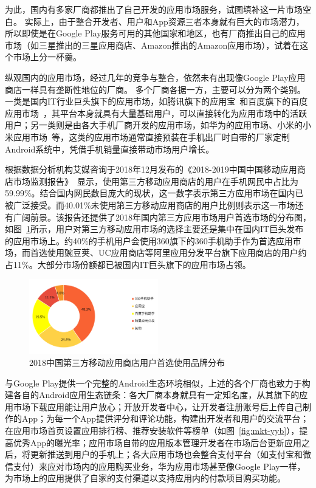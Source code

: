 为此，国内有多家厂商都推出了自己开发的应用市场服务，试图填补这一片市场空白。
实际上，由于整合开发者、用户和App资源三者本身就有巨大的市场潜力，所以即使是在Google Play服务可用的其他国家和地区，也有厂商推出自己的应用市场（如三星推出的三星应用商店、Amazon推出的Amazon应用市场），试着在这个市场上分一杯羹。

纵观国内的应用市场，经过几年的竞争与整合，依然未有出现像Google Play应用商店一样具有垄断性地位的厂商。
多个厂商各据一方，主要可以分为两个类别。
一类是国内IT行业巨头旗下的应用市场，如腾讯旗下的应用宝~\cite{Myapp}和百度旗下的百度应用市场~\cite{Baiduappstore}，其平台本身就具有大量基础用户，可以直接转化为应用市场中的活跃用户；另一类则是由各大手机厂商开发的应用市场，如华为的应用市场、小米的小米应用市场~\cite{Xiaomiappstore}等，这类的应用市场通常直接预装在手机出厂时自带的厂家定制Android系统中，凭借手机销量直接带动市场用户增长。

根据数据分析机构艾媒咨询于2018年12月发布的《2018-2019中国中国移动应用商店市场监测报告》~\cite{ChineseAppStoreReport}显示，使用第三方移动应用商店的用户在手机网民中占比为59.99\%。结合国内网民数目庞大的现状，这一数字表示第三方应用市场在国内已被广泛接受。而40.01\%未使用第三方移动应用商店的用户比例则表示这一市场还有广阔前景。该报告还提供了2018年国内第三方应用市场用户首选市场的分布图，如图~\ref{fig:CHN-Mkt-Dist}所示，用户对第三方移动应用市场的选择主要还是集中在国内IT巨头发布的应用市场上。约40\%的手机用户会使用360旗下的360手机助手作为首选应用市场，而首选使用豌豆荚、UC应用商店等阿里应用分发平台旗下应用商店的用户约占11\%。大部分市场份额都已被国内IT巨头旗下的应用市场占领。

\begin{figure}
	\centering
	\includegraphics[width=0.5\textwidth]{./Figures/edwin-CHN-mkt-dist.png}
	\caption{2018中国第三方移动应用商店用户首选使用品牌分布}
	\label{fig:CHN-Mkt-Dist}
\end{figure}

与Google Play提供一个完整的Android生态环境相似，上述的各个厂商也致力于构建各自的Android应用生态链条：各大厂商本身就具有一定知名度，从其旗下的应用市场下载应用能让用户放心；开放开发者中心，让开发者注册账号后上传自己制作的App；为每一个App提供评分和评论功能，构建出开发者和用户的交流平台；在应用市场首页设置应用排行榜、推荐安装软件等榜单（如图~\ref{fig:mkt-yyb}），提高优秀App的曝光率；应用市场自带的应用版本管理开发者在市场后台更新应用之后，将更新推送到用户的手机上；各大应用市场也会整合支付平台（如支付宝和微信支付）来应对市场内的应用购买业务，华为应用市场甚至像Google Play一样，为市场上的应用提供了自家的支付渠道以支持应用内的付款项目购买功能。

